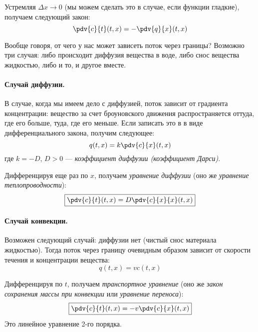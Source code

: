 Устремляя $\Delta x \to 0$ (мы можем сделать это в случае, если функции гладкие), получаем следующий закон:
%
\begin{equation*}
  \pdv{c}{t} (t, x) = - \pdv{q}{x} (t, x)
\end{equation*}

Вообще говоря, от чего у нас может зависеть поток через границы? Возможно три случая: либо происходит диффузия вещества в воде, либо снос вещества жидкостью, либо и то, и другое вместе.

\paragraph{Случай диффузии.}

В случае, когда мы имеем дело с диффузией, поток зависит от градиента концентрации: вещество за счет броуновского движения распространяется оттуда, где его больше, туда, где его меньше. Если записать это в в виде дифференциального закона, получим следующее:
%
\begin{equation*}
  q(t, x) = k \pdv{c}{x} (t, x)
\end{equation*}
%
где $k = -D$, $D > 0$ --- \emph{коэффициент диффузии (коэффициент Дарси)}.

Дифференцируя еще раз по $x$, получаем \emph{уравнение диффузии} (оно же \emph{уравнение теплопроводности}):
%
\begin{equation}
  \boxed{%
    \pdv{c}{t} (t, x) = D \pdv{c}{x}{x} (t, x)}
  \label{lecture1-diffusion}
\end{equation}

\paragraph{Случай конвекции.}

Возможен следующий случай: диффузии нет (чистый снос материала жидкостью). Тогда поток через границу очевидным образом зависит от скорости течения и концентрации вещества:
%
\begin{equation*}
  q(t, x) = vc(t, x)
\end{equation*}

Дифференцируя по $t$, получаем \emph{транспортное уравнение} (оно же \emph{закон сохранения массы при конвекции} или \emph{уравнение переноса}):
%
\begin{equation}
  \boxed{%
    \pdv{c}{t} (t, x) = - v \pdv{c}{x} (t, x)}
  \label{lecture1-transport}
\end{equation}
%
Это линейное уравнение 2-го порядка.


